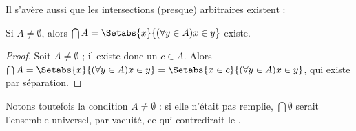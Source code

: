 \documentclass[../../../include/open-logic-section]{subfiles}
\begin{document}
Il s'avère aussi que les intersections (presque) arbitraires existent :

\begin{prop}
Si $A \neq \emptyset$, alors
$\bigcap A = \Setabs{x}{(\forall y \in A)x \in y}$ existe.
\end{prop}

\begin{proof}
Soit $A \neq \emptyset$ ; il existe donc un $c \in A$. Alors
$\bigcap A = \Setabs{x}{(\forall y \in A)x \in y}
= \Setabs{x \in c}{(\forall y \in A)x \in y}$, qui existe par
séparation.
\end{proof}

Notons toutefois la condition $A \neq \emptyset$ : si elle n'était pas
remplie, $\bigcap \emptyset$ serait l'ensemble universel, par vacuité, ce qui
contredirait le .
\end{document}
